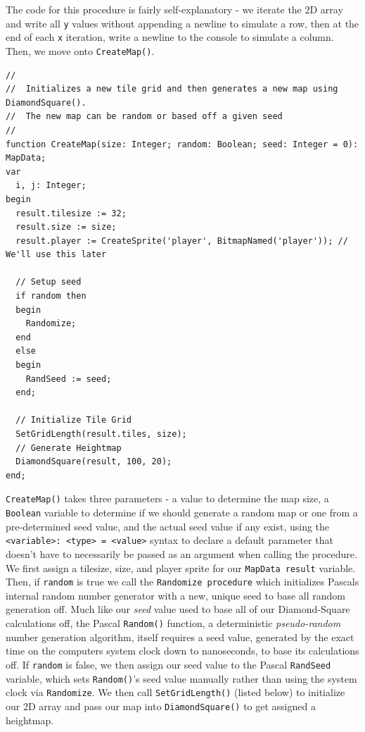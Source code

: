 \documentclass{article}
\begin{document}
The code for this procedure is fairly self-explanatory - we iterate the 2D array and write all \texttt{y} values without appending a newline to simulate a row, then at the end of each \texttt{x} iteration, write a newline to the console to simulate a column. Then, we move onto \texttt{CreateMap()}. 

\begin{verbatim}
//
//  Initializes a new tile grid and then generates a new map using DiamondSquare().
//  The new map can be random or based off a given seed
//
function CreateMap(size: Integer; random: Boolean; seed: Integer = 0): MapData;
var
  i, j: Integer;
begin
  result.tilesize := 32;
  result.size := size;
  result.player := CreateSprite('player', BitmapNamed('player')); // We'll use this later

  // Setup seed
  if random then
  begin
    Randomize;
  end
  else
  begin
    RandSeed := seed;
  end;

  // Initialize Tile Grid
  SetGridLength(result.tiles, size);
  // Generate Heightmap
  DiamondSquare(result, 100, 20);
end;
\end{verbatim}

\texttt{CreateMap()} takes three parameters - a value to determine the map size, a \texttt{Boolean} variable to determine if we should generate a random map or one from a pre-determined seed value, and the actual seed value if any exist, using the \texttt{<variable>: <type> = <value>} syntax to declare a default parameter that doesn't have to necessarily be passed as an argument when calling the procedure. We first assign a tilesize, size, and player sprite for our \texttt{MapData result} variable. Then, if \texttt{random} is true we call the \texttt{Randomize procedure} which initializes Pascals internal random number generator with a new, unique seed to base all random generation off. Much like our \emph{seed} value used to base all of our Diamond-Square calculations off, the Pascal \texttt{Random()} function, a deterministic \emph{pseudo-random} number generation algorithm, itself requires a seed value, generated by the exact time on the computers system clock down to nanoseconds, to base its calculations off. If \texttt{random} is false, we then assign our seed value to the Pascal \texttt{RandSeed} variable, which sets \texttt{Random()}'s seed value manually rather than using the system clock via \texttt{Randomize}. We then call \texttt{SetGridLength()} (listed below) to initialize our 2D array and pass our map into \texttt{DiamondSquare()} to get assigned a heightmap.
\end{document}
